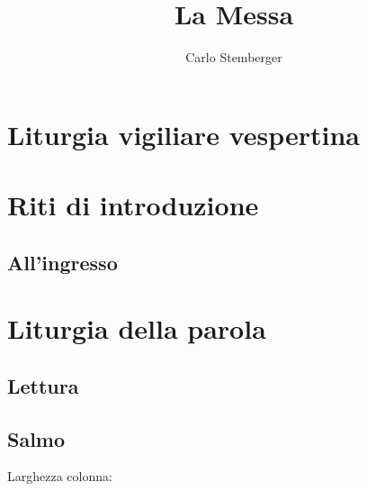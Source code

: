 \documentclass[leaflet,ambrosian,litcolor=red]{missa}
\title{La Messa}
\author{Carlo Stemberger}
\begin{document}


\section{Liturgia vigiliare vespertina}
\lipsum[1]
\section{Riti di introduzione}
\subsection{All'ingresso}
\lipsum[2]
\section{Liturgia della parola}
\subsection{Lettura}
\subsection{Salmo}
\lipsum[1]
\lipsum[1]

\onecolumn \pagebreak \twocolumn Larghezza colonna: \the\columnwidth
\onecolumn \layout \twocolumn
\end{document}
